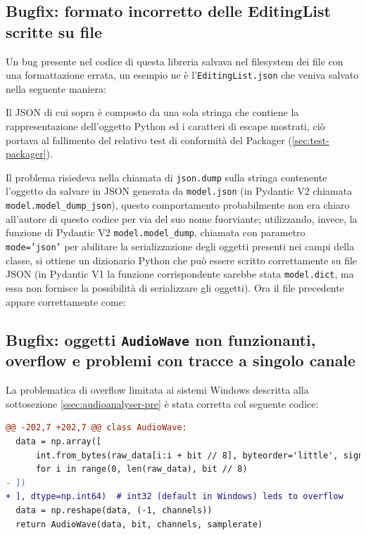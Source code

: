 \subsection{Bugfix: formato incorretto delle EditingList scritte su file} \label{ssec:mpaicaearp-formato-editinglist}
Un bug presente nel codice di questa libreria salvava nel filesystem dei file con una formattazione errata, un esempio ne è l'\texttt{EditingList.json} che veniva salvato nella seguente maniera:

Il JSON di cui sopra è composto da una sola stringa che contiene la rappresentazione dell'oggetto Python ed i caratteri di escape mostrati, ciò portava al fallimento del relativo test di conformità del Packager (\ref{sec:test-packager}).

Il problema risiedeva nella chiamata di \texttt{json.dump} sulla stringa contenente l'oggetto da salvare in JSON generata da \texttt{model.json} (in Pydantic V2 chiamata \verb|model.model_dump_json|), questo comportamento probabilmente non era chiaro all'autore di questo codice per via del suo nome fuorviante; utilizzando, invece, la funzione di Pydantic V2 \verb|model.model_dump|, chiamata con parametro \texttt{mode='json'} per abilitare la serializzazione degli oggetti presenti nei campi della classe, si ottiene un dizionario Python che può essere scritto correttamente su file JSON (in Pydantic V1 la funzione corrispondente sarebbe stata \texttt{model.dict}, ma essa non fornisce la possibilità di serializzare gli oggetti).
Ora il file precedente appare correttamente come:



\subsection{Bugfix: oggetti \texttt{AudioWave} non funzionanti, overflow e problemi con tracce a singolo canale} \label{ssec:mpaicaearp-audiowave}  %
La problematica di overflow limitata ai sistemi Windows descritta alla sottosezione \ref{ssec:audioanalyser-pre} è stata corretta col seguente codice:
\begin{lstlisting}[language=diff, caption=Risoluzione del problema di overflow degli oggetti AudioWave]
@@ -202,7 +202,7 @@ class AudioWave:
  data = np.array([
      int.from_bytes(raw_data[i:i + bit // 8], byteorder='little', signed=True)
      for i in range(0, len(raw_data), bit // 8)
- ])
+ ], dtype=np.int64)  # int32 (default in Windows) leds to overflow
  data = np.reshape(data, (-1, channels))
  return AudioWave(data, bit, channels, samplerate)
\end{lstlisting}

